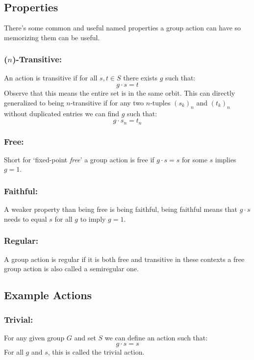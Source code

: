 \subsection{Properties}
There's some common and useful named properties a group action can have so memorizing them can be useful.

\subsubsection{($n$)-Transitive:}
An action is transitive if for all $s,t\in S$ there exists $g$ such that:
\[g\cdot s = t\]
Observe that this means the entire set is in the same orbit.
This can directly generalized to being $n$-transitive if for any two $n$-tuples   $(s_k)_n$ and $(t_k)_n$ without duplicated entries we can find $g$ such that:
\[g\cdot s_n = t_n\]

\subsubsection{Free:}
Short for `fixed-point {\em free}' a group action is free if $g\cdot s=s$ for some $s$ implies $g=1$. 

\subsubsection{Faithful:}
A weaker property than being free is being faithful,
being faithful means that $g\cdot s$ needs to equal $s$ for all $g$ to imply $g=1$.

\subsubsection{Regular:}
A group action is regular if it is both free and transitive in these contexts a free group action is also called a semiregular one.

\subsection{Example Actions}
\subsubsection{Trivial:}
For any given group $G$ and set $S$ we can define an action such that:
\[g\cdot s = s\]
For all $g$ and $s$,
this is called the  trivial action.

